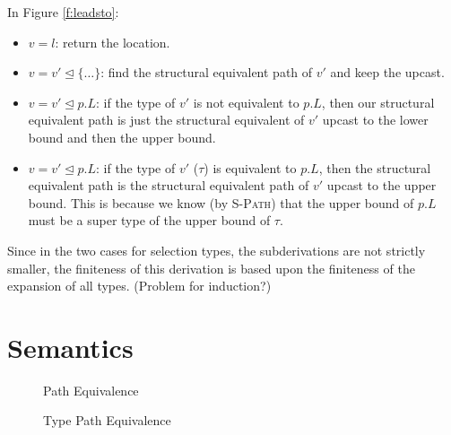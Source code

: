 \documentclass{llncs}
\numberwithin{subcase}{case}
\numberwithin{case}{theorem}
\numberwithin{case}{lemma}
\begin{document}
In Figure \ref{f:leadsto}:
\begin{itemize}
\item
$v = l$: return the location.
\item
$v = v' \unlhd \{\ldots\}$: find the structural equivalent path of $v'$ and keep the upcast.
\item
$v = v' \unlhd p.L$: if the type of $v'$ is not equivalent to $p.L$, then our structural equivalent path is just the structural equivalent of $v'$ upcast to the lower bound and then the upper bound.
\item
$v = v' \unlhd p.L$: if the type of $v'$ ($\tau$) is equivalent to $p.L$, then the structural equivalent path is the structural equivalent path of $v'$ upcast to the upper bound. This is because we know (by \textsc{S-Path}) that the upper bound of $p.L$ must be a super type of the upper bound of $\tau$.
\end{itemize}
Since in the two cases for selection types, the subderivations are not strictly smaller, the finiteness of this derivation is based upon the finiteness of the expansion of all types. (Problem for induction?)


\section{Semantics}


\begin{figure}[h]
\caption{Path Equivalence}
\label{f:path_equiv}
\end{figure}


\begin{figure}[h]
\caption{Type Path Equivalence}
\label{f:type_equiv}
\end{figure}
\end{document}
